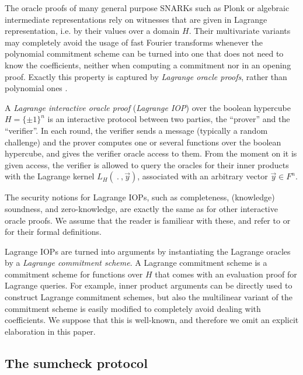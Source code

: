 \documentclass[11pt]{article}
\theoremstyle{definition}
\theoremstyle{definition}
\begin{document}
The oracle proofs of many general purpose SNARKs such as Plonk \cite{Plonk} or algebraic intermediate representations \cite{Starks} rely on witnesses that are given in Lagrange representation, i.e. by their values over a domain $H$.
Their multivariate variants may completely avoid the usage of fast Fourier transforms whenever the polynomial commitment scheme can be turned into one that does not need to know the coefficients, neither when computing a commitment nor in an opening proof.
Exactly this property is captured by \textit{Lagrange oracle proofs}, rather than polynomial ones \cite{Dark}.

A \textit{Lagrange interactive oracle proof} (\textit{Lagrange IOP}) over the boolean hypercube $H=\{\pm 1\}^n$ is an interactive protocol between two parties, the ``prover'' and the ``verifier''.
In each round, the verifier sends a message (typically a random challenge) and the prover computes one or several functions over the boolean hypercube, and gives the verifier oracle access to them.
From the moment on it is given access, the verifier is allowed to query the oracles for their inner products with the Lagrange kernel $L_H(\:.\:, \vec y)$, associated with an arbitrary vector $\vec y\in F^n$. 

The security notions for Lagrange IOPs, such as completeness, (knowledge) soundness, and zero-knowledge, are exactly the same as for other interactive oracle proofs.
We assume that the reader is familiear with these, and refer to \cite{IOPs} or \cite{Dark} for their formal definitions.

Lagrange IOPs are turned into arguments by instantiating the Lagrange oracles by a  \textit{Lagrange commitment scheme}.
A Lagrange commitment scheme is a commitment scheme for functions over $H$ that comes with an evaluation proof for Lagrange queries.
For example, inner product arguments \cite{BootleGroth} can be directly used to construct Lagrange commitment schemes,
but also the multilinear variant \cite{MVKZG} of the \cite{Kate} commitment scheme is easily modified to completely avoid dealing with coefficients. 
We suppose that this is well-known, and therefore we omit an explicit elaboration in this paper.


\subsection{The sumcheck protocol}
\end{document}
